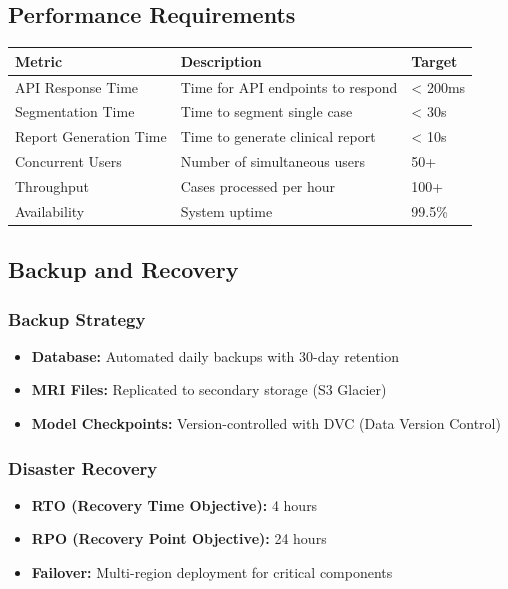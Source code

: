 \documentclass[12pt,a4paper]{article}
\begin{document}
\subsection{Performance Requirements}

\begin{table}[H]
\centering
\begin{tabularx}{\textwidth}{|l|X|l|}
\hline
\textbf{Metric} & \textbf{Description} & \textbf{Target} \\
\hline
API Response Time & Time for API endpoints to respond & < 200ms \\
\hline
Segmentation Time & Time to segment single case & < 30s \\
\hline
Report Generation Time & Time to generate clinical report & < 10s \\
\hline
Concurrent Users & Number of simultaneous users & 50+ \\
\hline
Throughput & Cases processed per hour & 100+ \\
\hline
Availability & System uptime & 99.5\% \\
\hline
\end{tabularx}
\end{table}

\subsection{Backup and Recovery}

\subsubsection{Backup Strategy}
\begin{itemize}
    \item \textbf{Database:} Automated daily backups with 30-day retention
    \item \textbf{MRI Files:} Replicated to secondary storage (S3 Glacier)
    \item \textbf{Model Checkpoints:} Version-controlled with DVC (Data Version Control)
\end{itemize}

\subsubsection{Disaster Recovery}
\begin{itemize}
    \item \textbf{RTO (Recovery Time Objective):} 4 hours
    \item \textbf{RPO (Recovery Point Objective):} 24 hours
    \item \textbf{Failover:} Multi-region deployment for critical components
\end{itemize}
\end{document}

